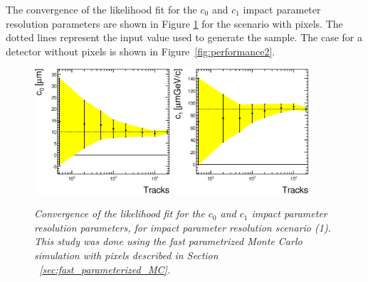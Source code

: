 \documentclass{cmspaper}
\begin{document}



 
The convergence of the likelihood fit for the $c_0$ and  $c_1$ impact parameter resolution parameters are shown in Figure \ref{fig:performance}
for the scenario with pixels. 
The dotted lines represent the input value used to generate the sample. The case for a detector without pixels is shown
in Figure~\ref{fig:performance2}. 

\begin{figure}[hbtp]
  \begin{center}
    \includegraphics[width=0.45\textwidth]{figures/fxy_lhfit_c0.eps}
    \includegraphics[width=0.45\textwidth]{figures/fxy_lhfit_c1.eps}
   \caption{\it Convergence of the likelihood fit for the $c_0$ and  $c_1$ impact parameter resolution parameters, for impact parameter resolution 
scenario (1). This study was done using the fast parametrized Monte 
Carlo simulation with pixels described in Section ~\ref{sec:fast_parameterized_MC}.}
   \label{fig:performance}
  \end{center}
\end{figure}
\end{document}
